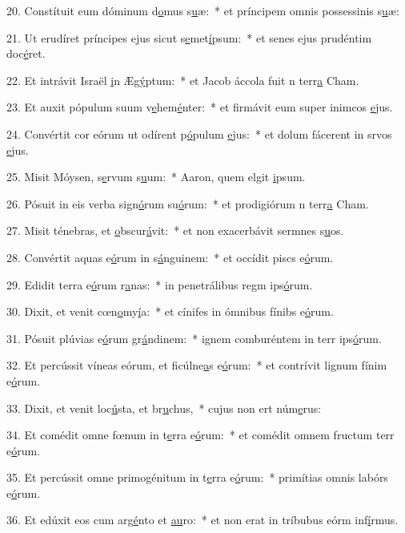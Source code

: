 20. Constítuit eum dóminum d\uline{o}mus s\uline{u}æ:~* et príncipem omnis possessinis s\uline{u}æ:\par 
21. Ut erudíret príncipes ejus sicut s\uline{e}met\uline{í}psum:~* et senes ejus prudéntim doc\uline{é}ret.\par 
22. Et intrávit Israël \uline{i}n Æg\uline{ý}ptum:~* et Jacob áccola fuit n terr\uline{a} Cham.\par 
23. Et auxit pópulum suum v\uline{e}hem\uline{é}nter:~* et firmávit eum super inimcos \uline{e}jus.\par 
24. Convértit cor eórum ut odírent p\uline{ó}pulum \uline{e}jus:~* et dolum fácerent in srvos \uline{e}jus.\par 
25. Misit Móysen, s\uline{e}rvum s\uline{u}um:~* Aaron, quem elgit \uline{i}psum.\par 
26. Pósuit in eis verba sign\uline{ó}rum su\uline{ó}rum:~* et prodigiórum n terr\uline{a} Cham.\par 
27. Misit ténebras, et \uline{o}bscur\uline{á}vit:~* et non exacerbávit sermnes s\uline{u}os.\par 
28. Convértit aquas e\uline{ó}rum in s\uline{á}nguinem:~* et occídit piscs e\uline{ó}rum.\par 
29. Edidit terra e\uline{ó}rum r\uline{a}nas:~* in penetrálibus regm ips\uline{ó}rum.\par 
30. Dixit, et venit cœn\uline{o}my\uline{í}a:~* et cínifes in ómnibus fínibs e\uline{ó}rum.\par 
31. Pósuit plúvias e\uline{ó}rum gr\uline{á}ndinem:~* ignem comburéntem in terr ips\uline{ó}rum.\par 
32. Et percússit víneas eórum, et ficúlne\uline{a}s e\uline{ó}rum:~* et contrívit lignum fínim e\uline{ó}rum.\par 
33. Dixit, et venit loc\uline{ú}sta, et br\uline{u}chus,~* cujus non ert núm\uline{e}rus:\par 
34. Et comédit omne fœnum in t\uline{e}rra e\uline{ó}rum:~* et comédit omnem fructum terr e\uline{ó}rum.\par 
35. Et percússit omne primogénitum in t\uline{e}rra e\uline{ó}rum:~* primítias omnis labórs e\uline{ó}rum.\par 
36. Et edúxit eos cum arg\uline{é}nto et \uline{au}ro:~* et non erat in tríbubus eórm inf\uline{í}rmus.\par 

